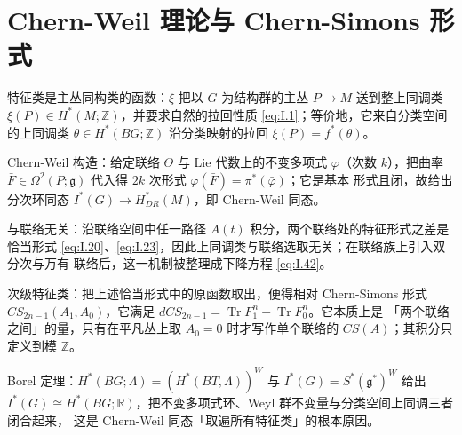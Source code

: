 
\section{Chern-Weil 理论与 Chern-Simons 形式} %

\begin{keytakeaways}
  \item 特征类是主丛同构类的函数：$\xi$ 把以 $G$ 为结构群的主丛 $P\to M$ 送到整上同调类
    $\xi(P)\in H^*(M;\mathbb{Z})$，并要求自然的拉回性质 \eqref{eq:I.1}；等价地，它来自分类空间
    的上同调类 $\theta\in H^*(BG;\mathbb{Z})$ 沿分类映射的拉回 $\xi(P)=f^*(\theta)$。
  \item Chern-Weil 构造：给定联络 $\Theta$ 与 Lie 代数上的不变多项式 $\varphi$（次数 $k$），把曲率
    $\bar F\in\Omega^2(P;\mathfrak{g})$ 代入得 $2k$ 次形式 $\varphi(\bar F)=\pi^*(\bar\varphi)$；它是基本
    形式且闭，故给出分次环同态 $I^*(G)\to H^*_{DR}(M)$，即 Chern-Weil 同态。
  \item 与联络无关：沿联络空间中任一路径 $A(t)$ 积分，两个联络处的特征形式之差是恰当形式
    \eqref{eq:I.20}、\eqref{eq:I.23}，因此上同调类与联络选取无关；在联络族上引入双分次与万有
    联络后，这一机制被整理成下降方程 \eqref{eq:I.42}。
  \item 次级特征类：把上述恰当形式中的原函数取出，便得相对 Chern-Simons 形式
    $CS_{2n-1}(A_1,A_0)$，它满足 $dCS_{2n-1}=\operatorname{Tr}F_1^n-\operatorname{Tr}F_0^n$。它本质上是
    「两个联络之间」的量，只有在平凡丛上取 $A_0=0$ 时才写作单个联络的 $CS(A)$；其积分只
    定义到模 $\mathbb{Z}$。
  \item Borel 定理：$H^*(BG;\Lambda)=(H^*(BT,\Lambda))^W$ 与 $I^*(G)=S^*(\mathfrak{g}^*)^W$ 给出
    $I^*(G)\cong H^*(BG;\mathbb{R})$，把不变多项式环、Weyl 群不变量与分类空间上同调三者闭合起来，
    这是 Chern-Weil 同态「取遍所有特征类」的根本原因。
\end{keytakeaways}

